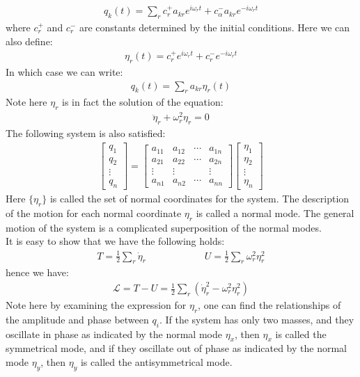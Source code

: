 \documentclass[11pt,oneside]{book}
\theoremstyle{break}
\theoremstyle{break}
\newcommand{\bmat}[1]{\begin{bmatrix}
#1
\end{bmatrix}}
\begin{document}
\begin{align*}
q_k(t) = \sum_{r} c_{r}^+ a_{kr} e^{i \omega_r t} + c_\alpha^- a_{kr}e^{-i\omega_r t}
\end{align*}
where $c_r^+$ and $c_r^-$ are constants determined by the initial conditions. Here we can also define:
\begin{align*}
\eta_r (t) = c_r^+ e^{i \omega_r t} + c_r^- e^{-i \omega_r t}
\end{align*}
In which case we can write:
\begin{align*}
q_k(t) = \sum_r a_{kr}\eta_r(t)
\end{align*}
Note here $\eta_r$ is in fact the solution of the equation:
\begin{align*}
\ddot{\eta}_r + \omega_r^2 \eta_r = 0
\end{align*}
The following system is also satisfied:
\begin{align*}
\bmat{q_1 \\ q_2 \\ \vdots \\ q_n} = \bmat{a_{11} & a_{12} & \cdots & a_{1n}\\
a_{21} & a_{22} & \cdots & a_{2n}\\
\vdots & \vdots & & \vdots\\
a_{n1} & a_{n2} & \cdots & a_{nn}}\bmat{\eta_1 \\\eta_2 \\ \vdots \\ \eta_n} \tag{NMS}
\end{align*}
Here $\{\eta_r\}$ is called the set of normal coordinates for the system. The description of the motion for each normal coordinate $\eta_r$ is called a normal mode. The general motion of the system is a complicated superposition of the normal modes.\\

It is easy to show that we have the following holds:
\begin{align*}
T = \frac{1}{2}\sum_r \dot{\eta}_r \qquad \qquad \qquad U = \frac{1}{2} \sum_r \omega_r^2 \eta_r^2
\end{align*}
hence we have:
\begin{align*}
\mathcal{L} = T-U = \frac{1}{2} \sum_r (\dot{\eta}_r^2 - \omega_r^2 \eta_r^2)
\end{align*}
Note here by examining the expression for $\eta_r$, one can find the relationships of the amplitude and phase between $q_i$. If the system has only two masses, and they oscillate in phase as indicated by the normal mode $\eta_x$, then $\eta_x$ is called the symmetrical mode, and if they oscillate out of phase as indicated by the normal mode $\eta_y$, then $\eta_y$ is called the antisymmetrical mode.\\
\end{document}
